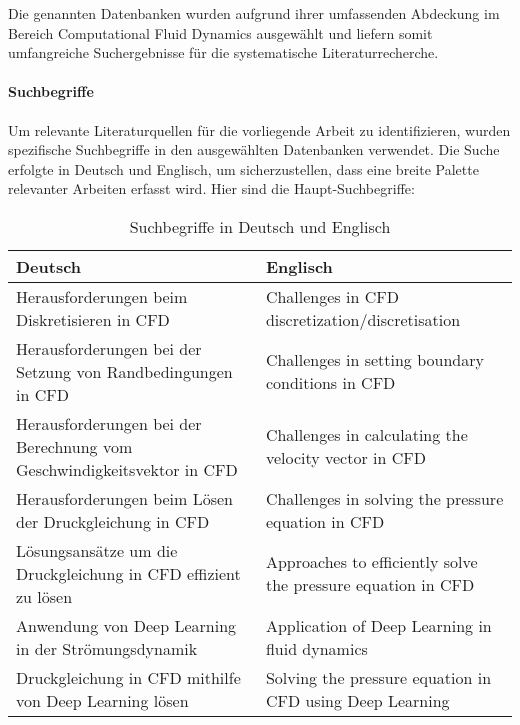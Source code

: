 Die genannten Datenbanken wurden aufgrund ihrer umfassenden Abdeckung im Bereich Computational Fluid Dynamics ausgewählt und liefern somit umfangreiche Suchergebnisse für die systematische Literaturrecherche.

\paragraph{Suchbegriffe}

Um relevante Literaturquellen für die vorliegende Arbeit zu identifizieren, wurden spezifische Suchbegriffe in den ausgewählten Datenbanken verwendet. Die Suche erfolgte in Deutsch und Englisch, um sicherzustellen, dass eine breite Palette relevanter Arbeiten erfasst wird. Hier sind die Haupt-Suchbegriffe:

\begin{table}[ht]
    \centering
    \small
    \begin{tabular}{p{}|p{}}
        \toprule
        \textbf{Deutsch} & \textbf{Englisch} \\
        \midrule
        Herausforderungen beim Diskretisieren in CFD & Challenges in CFD discretization/discretisation \\
        \midrule
        Herausforderungen bei der Setzung von Randbedingungen in CFD & Challenges in setting boundary conditions in CFD \\
        \midrule
        Herausforderungen bei der Berechnung vom Geschwindigkeitsvektor in CFD & Challenges in calculating the velocity vector in CFD \\
        \midrule
        Herausforderungen beim Lösen der Druckgleichung in CFD & Challenges in solving the pressure equation in CFD \\
        \midrule
        Lösungsansätze um die Druckgleichung in CFD effizient zu lösen & Approaches to efficiently solve the pressure equation in CFD \\
        \midrule
        Anwendung von Deep Learning in der Strömungsdynamik & Application of Deep Learning in fluid dynamics \\
        \midrule
        Druckgleichung in CFD mithilfe von Deep Learning lösen & Solving the pressure equation in CFD using Deep Learning \\
        \bottomrule
    \end{tabular}
    \caption{Suchbegriffe in Deutsch und Englisch}
    \label{tab:search_terms}
\end{table}

